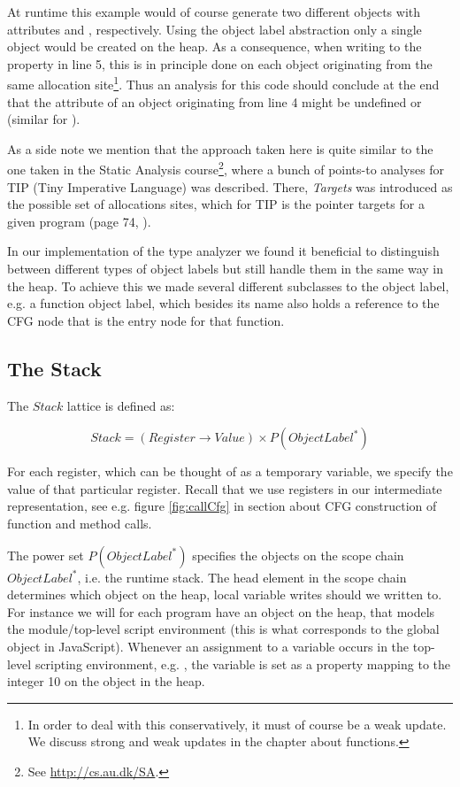 At runtime this example would of course generate two different  objects with attributes  and , respectively. Using the object label abstraction only a single  object would be created on the heap. As a consequence, when writing to the property  in line 5, this is in principle done on each object originating from the same allocation site\footnote{In order to deal with this conservatively, it must of course be a weak update. We discuss strong and weak updates in the chapter about functions.}. Thus an analysis for this code should conclude at the end that the attribute  of an object originating from line 4 might be undefined or  (similar for ).

As a side note we mention that the approach taken here is quite similar to the one taken in the Static Analysis course\footnote{See \url{http://cs.au.dk/SA}.}, where a bunch of points-to analyses for TIP (Tiny Imperative Language) was described. There, \textit{Targets} was introduced as the possible set of allocations sites, which for TIP is the pointer targets  for a given program (page 74, \cite{sa}).

In our implementation of the type analyzer we found it beneficial to distinguish between different types of object labels but still handle them in the same way in the heap. To achieve this we made several different subclasses to the object label, e.g. a function object label, which besides its name also holds a reference to the CFG node that is the entry node for that function.

\subsection{The Stack}
The $Stack$ lattice is defined as:

\begin{equation*}
Stack = (Register \rightarrow Value) \times P(ObjectLabel^{*})
\end{equation*}

For each register, which can be thought of as a temporary variable, we specify the value of that particular register. Recall that we use registers in our intermediate representation, see e.g. figure \ref{fig:callCfg} in section \label{CFG calls} about CFG construction of function and method calls.

The power set $P(ObjectLabel^{*})$ specifies the objects on the scope chain $ObjectLabel^{*}$, i.e. the runtime stack. The head element in the scope chain determines which object on the heap, local variable writes should we written to. For instance we will for each program have an object on the heap, that models the module/top-level script environment \cite{pyref.main} (this is what corresponds to the global object in JavaScript). Whenever an assignment to a variable occurs in the top-level scripting environment, e.g. , the variable  is set as a property mapping to the integer 10 on the  object in the heap.

